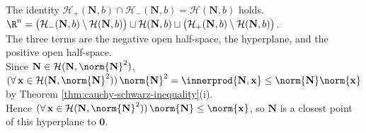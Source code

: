 \begin{remark} \label{rem:hyperplane-basic-geometry} \\
The identity $\mathcal{H}_+(\mathbf{N},b)\cap\mathcal{H}_-(\mathbf{N},b)=\mathcal{H}(\mathbf{N},b)$ holds.\\
$\R^n=\bigl(\mathcal{H}_-(\mathbf{N},b)\setminus\mathcal{H}(\mathbf{N},b)\bigr)\sqcup\mathcal{H}(\mathbf{N},b)\sqcup\bigl(\mathcal{H}_+(\mathbf{N},b)\setminus\mathcal{H}(\mathbf{N},b)\bigr)$.\\
The three terms are the negative open half-space, the hyperplane, and the positive open half-space.\\
Since $\mathbf{N}\in\mathcal{H}(\mathbf{N},\norm{\mathbf{N}}^2)$, $(\forall\,\mathbf{x}\in\mathcal{H}(\mathbf{N},\norm{\mathbf{N}}^2))\,\norm{\mathbf{N}}^2=\innerprod{\mathbf{N},\mathbf{x}}\leq\norm{\mathbf{N}}\norm{\mathbf{x}}$ by Theorem \ref{thm:cauchy-schwarz-inequality}(i).\\
Hence $(\forall\,\mathbf{x}\in\mathcal{H}(\mathbf{N},\norm{\mathbf{N}}^2))\,\norm{\mathbf{N}}\leq\norm{\mathbf{x}}$, so $\mathbf{N}$ is a closest point of this hyperplane to $\mathbf{0}$.
\end{remark}

